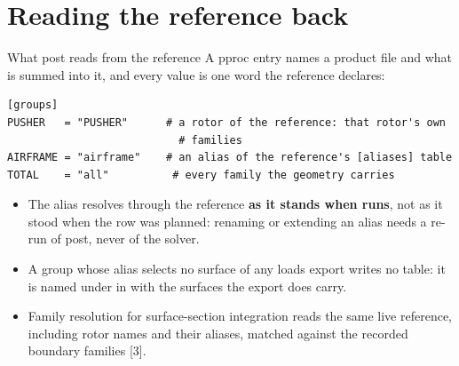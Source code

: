 %
\section{Reading the reference back}

\begin{frame}[fragile]{What post reads from the reference}
\small A pproc \code{[groups]} entry names a product file and what is
summed into it, and every value is one word the reference declares:
\begin{lstlisting}[basicstyle=\ttfamily\scriptsize,numbers=none]
[groups]
PUSHER   = "PUSHER"      # a rotor of the reference: that rotor's own
                           # families
AIRFRAME = "airframe"    # an alias of the reference's [aliases] table
TOTAL    = "all"          # every family the geometry carries
\end{lstlisting}
\begin{itemize}\small
  \item The alias resolves through the reference \textbf{as it stands when
         runs}, not as it stood when the row was
        planned: renaming or extending an alias needs a re-run of post,
        never of the solver.
  \item A group whose alias selects no surface of any loads export writes
        no table: it is named under  in 
        with the surfaces the export does carry.
  \item Family resolution for surface-section integration reads the same
        live reference, including rotor names and their aliases, matched
        against the recorded boundary families [3].
\end{itemize}
\end{frame}

